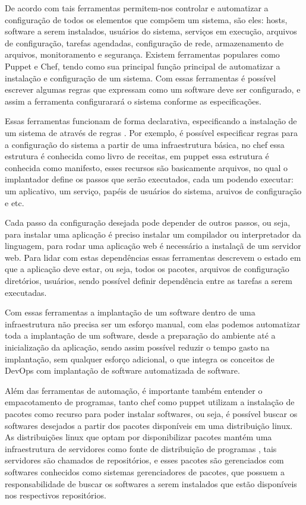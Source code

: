 De acordo com \cite{6265084} tais ferramentas permitem-nos controlar e automatizar
a configuração de todos os elementos que compõem um sistema, são eles: hosts, software a serem instalados,
usuários do sistema, serviços em execução, arquivos de configuração, tarefas agendadas,
configuração de rede, armazenamento de arquivos, monitoramento e segurança. Existem
ferramentas populares como Puppet e Chef, tendo como sua principal função principal
de automatizar a instalação e configuração de um sistema. Com essas ferramentas é
possível escrever algumas regras que expressam como um software deve ser configurado,
e assim a ferramenta configurarará o sistema conforme as especificações.

Essas ferramentas funcionam de forma declarativa, especificando a instalação de um sistema de
através de regras \cite{6265084}. Por exemplo, é possível especificar regras para a configuração do sistema
a partir de uma infraestrutura básica, no chef essa estrutura é conhecida como livro
de receitas, em puppet essa estrutura é conhecida como manifesto, esses recursos
são basicamente arquivos, no qual o implantador define os passos que serão executados,
cada um podendo executar: um aplicativo, um serviço, papéis de usuários do sistema,
aruivos de configuração e etc.

Cada passo da configuração desejada pode depender de outros passos, ou seja, para
instalar uma aplicação é preciso instalar um compilador ou interpretador da linguagem,
para rodar uma aplicação web é necessário a instalaçã de um servidor web. Para
lidar com estas dependências essas ferramentas descrevem o estado em que a aplicação
deve estar, ou seja, todos os pacotes, arquivos de configuração diretórios, usuários,
sendo possível definir dependência entre as tarefas a serem executadas.

Com essas ferramentas a implantação de um software dentro de uma infraestrutura
não precisa ser um esforço manual, com elas podemos automatizar toda a implantação
de um software, desde a preparação do ambiente até a inicialização da aplicação,
sendo assim possível reduzir o tempo gasto na implantação, sem qualquer esforço
adicional, o que integra os conceitos de DevOps com implantação de software automatizada
de software.

Além das ferramentas de automação, é importante também entender o empacotamento de
programas, tanto chef como puppet utilizam a instalação de pacotes como recurso para
poder instalar softwares, ou seja, é possível buscar os softwares desejados a partir
dos pacotes disponíveis em uma distribuição linux. As distribuições linux que
optam por disponibilizar pacotes mantém uma infraestrutura de servidores como fonte
de distribuição de programas \cite{araujo2011apprecommender}, tais servidores são
chamados de repositórios, e esses pacotes são gerenciados com softwares conhecidos
como sistemas gerenciadores de pacotes, que possuem a responsabilidade de buscar
os softwares a serem instalados que estão disponíveis nos respectivos repositórios.

